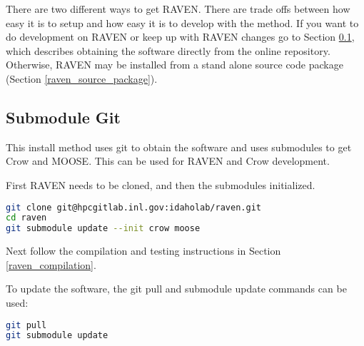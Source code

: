 There are two different ways to get RAVEN.  There are trade offs
between how easy it is to setup and how easy it is to develop with the
method.  If you want to do development on RAVEN or keep up with RAVEN
changes go to Section \ref{submodule_git}, which describes obtaining
the software directly from the online repository.  Otherwise, RAVEN
may be installed from a stand alone source code package (Section
\ref{raven_source_package}).



\subsection{Submodule Git}
\label{submodule_git}

This install method uses git to obtain the software and uses
submodules to get Crow and MOOSE.  This can be used for RAVEN and Crow
development.

First RAVEN needs to be cloned, and then the submodules initialized.

\begin{lstlisting}[language=bash]
git clone git@hpcgitlab.inl.gov:idaholab/raven.git
cd raven
git submodule update --init crow moose
\end{lstlisting}

Next follow the compilation and testing instructions in Section \ref{raven_compilation}.

To update the software, the git pull and submodule update commands can
be used:

\begin{lstlisting}[language=bash]
git pull
git submodule update
\end{lstlisting}




